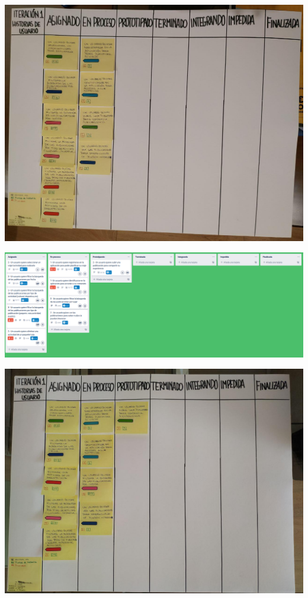 \documentclass[spanish]{beamer}
\begin{document}
\begin{frame}
	\begin{center}
		\includegraphics[angle=90, scale=0.32]{papel1_1}
	\end{center}
\end{frame}

\begin{frame}
	\begin{center}
		\includegraphics[scale=0.25]{trello1_2}
	\end{center}
\end{frame}

\begin{frame}
	\begin{center}
		\includegraphics[angle=90, scale=0.33]{papel1_2}
	\end{center}
\end{frame}
\end{document}
